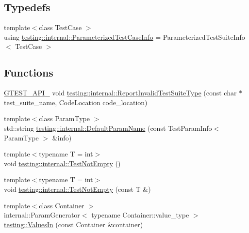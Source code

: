 \subsection*{Typedefs}
\begin{DoxyCompactItemize}
\item 
{\footnotesize template$<$class Test\+Case $>$ }\\using \hyperlink{namespacetesting_1_1internal_aac31682b6b41997d6cc610a5787dc8bc}{testing\+::internal\+::\+Parameterized\+Test\+Case\+Info} = Parameterized\+Test\+Suite\+Info$<$ Test\+Case $>$
\end{DoxyCompactItemize}
\subsection*{Functions}
\begin{DoxyCompactItemize}
\item 
\hyperlink{gtest-port_8h_aa73be6f0ba4a7456180a94904ce17790}{G\+T\+E\+S\+T\+\_\+\+A\+P\+I\+\_\+} void \hyperlink{namespacetesting_1_1internal_a5d3e97443d23bf1824f87feb172efd39}{testing\+::internal\+::\+Report\+Invalid\+Test\+Suite\+Type} (const char $\ast$test\+\_\+suite\+\_\+name, Code\+Location code\+\_\+location)
\item 
{\footnotesize template$<$class Param\+Type $>$ }\\std\+::string \hyperlink{namespacetesting_1_1internal_a954ec4a8a932dac7743e77e459ffefdc}{testing\+::internal\+::\+Default\+Param\+Name} (const Test\+Param\+Info$<$ Param\+Type $>$ \&info)
\item 
{\footnotesize template$<$typename T  = int$>$ }\\void \hyperlink{namespacetesting_1_1internal_aa07a04b597551a51d862911b22a94eb9}{testing\+::internal\+::\+Test\+Not\+Empty} ()
\item 
{\footnotesize template$<$typename T  = int$>$ }\\void \hyperlink{namespacetesting_1_1internal_ad2f14c6dc7d6c3d78884910943e11bc1}{testing\+::internal\+::\+Test\+Not\+Empty} (const T \&)
\item 
{\footnotesize template$<$class Container $>$ }\\internal\+::\+Param\+Generator$<$ typename Container\+::value\+\_\+type $>$ \hyperlink{namespacetesting_aa67d0c8470c5f69fcfcacc9e775fa982}{testing\+::\+Values\+In} (const Container \&container)
\end{DoxyCompactItemize}
